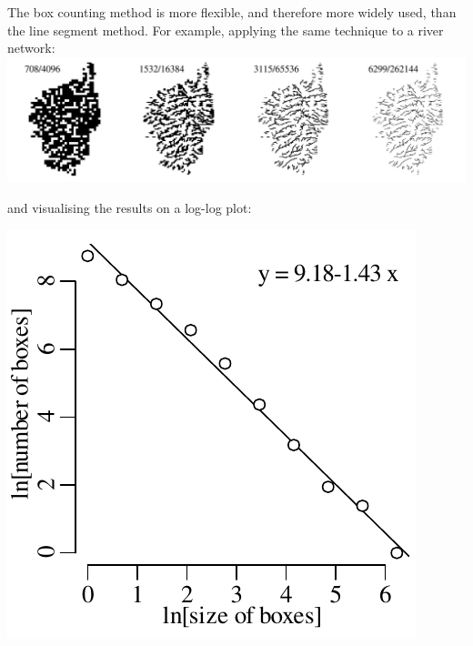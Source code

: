 The box counting method is more flexible, and therefore more widely
used, than the line segment method. For example, applying the same
technique to a river network:\\

\noindent\includegraphics[width=\textwidth]{../figures/Corsica.png}
\begingroup {}
\label{fig:Corsica}
\endgroup

\noindent and visualising the results on a log-log plot:

\noindent\begin{minipage}[t][][b]{.3\textwidth}
  \includegraphics[width=\textwidth]{../figures/Corsicaboxcounts.pdf}\\
\end{minipage}
\begin{minipage}[t][][t]{.7\textwidth}
  \label{fig:Corsicaboxcounts}
\end{minipage}

